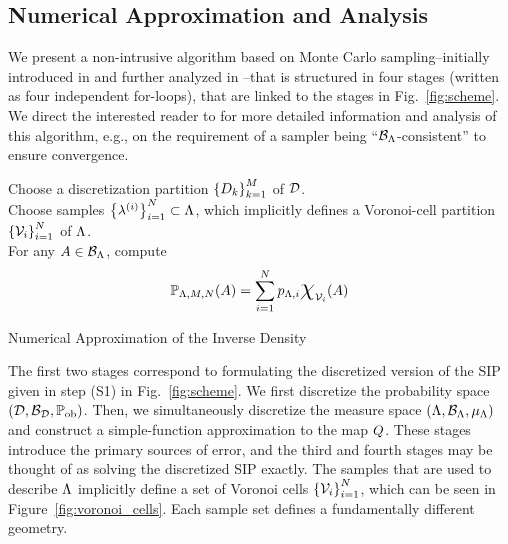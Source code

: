 \subsection{Numerical Approximation and Analysis}\label{sec:set-algorithm}
We present a non-intrusive algorithm based on Monte Carlo sampling\---initially introduced in \cite{BET+14} and further analyzed in \cite{BET+14-arxiv}\---that is structured in four stages (written as four independent for-loops), that are linked to the stages in Fig.~\ref{fig:scheme}.
We direct the interested reader to \cite{BET+14-arxiv} for more detailed information and analysis of this algorithm, e.g., on the requirement of a sampler being ``$\mathcal{B}_{{\Lambda}}$-consistent'' to ensure convergence.


\begin{algorithm}[hbtp]
\DontPrintSemicolon
Choose a discretization partition $\left\{D_k\right\}_{k=1}^{M}$ of $\mathcal{D}$.\\
	Choose samples $\left\{\lambda^{(i)}\right\}_{i=1}^{N} \subset {\Lambda}$, which implicitly defines a Voronoi-cell partition $\left\{\mathcal{V}_i\right\}_{i=1}^{N}$ of ${\Lambda}$.\\
	For any $A\in \mathcal{B}_{{\Lambda}}$, compute
	\begin{equation}
	\PP_{\pspace, \ndiscs, \nsamps} (A) = \sum_{\iparam=1}^\nsamps p_{\pspace, \iparam} \Chi_{\VV_\iparam} (A)
	\end{equation}
 \caption{Numerical Approximation of the Inverse Density}
 \label{alg:inv_density}
\end{algorithm}


The first two stages correspond to formulating the discretized version of the SIP given in step (S1) in Fig.~\ref{fig:scheme}.
We first discretize the probability space $(\mathcal{D}, \mathcal{B}_{\mathcal{D}}, \operatorname*{\mathbb{P}_{ob}})$.
Then, we simultaneously discretize the measure space $({\Lambda}, \mathcal{B}_{{\Lambda}}, \mu_{{\Lambda}})$ and construct a simple-function approximation to the map $Q$.
These stages introduce the primary sources of error, and the third and fourth stages may be thought of as solving the discretized SIP exactly.
The samples that are used to describe ${\Lambda}$ implicitly define a set of Voronoi cells $\left\{\mathcal{V}_i\right\}_{i=1}^{N}$, which can be seen in Figure~\ref{fig:voronoi_cells}.
Each sample set defines a fundamentally different geometry.

